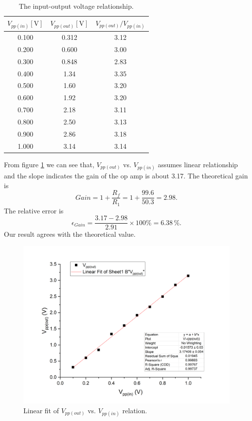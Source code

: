 \documentclass{article}
\begin{document}
\begin{table}[H]
\centering
\begin{tabular}{ccc}
\toprule
$V_{pp(in)}[\text{V}]$ & $V_{pp(out)}[\text{V}]$ & ${V_{pp(out)}}/{V_{pp(in)}}$\\
\midrule
0.100 & 0.312 & 3.12\\
0.200 & 0.600 & 3.00\\
0.300 & 0.848 & 2.83\\
0.400 & 1.34 & 3.35\\
0.500 & 1.60 & 3.20\\
0.600 & 1.92 & 3.20\\
0.700 & 2.18 & 3.11\\
0.800 & 2.50 & 3.13\\
0.900 & 2.86 & 3.18\\
1.000 & 3.14 & 3.14\\
\bottomrule
\end{tabular}
\caption{The input-output voltage relationship.}\label{TableV1}
\end{table}

From figure \ref{FigNonFit} we can see that, $V_{pp(out)}$ vs. $V_{pp(in)}$ assumes linear relationship and the slope indicates the gain of the op amp is about 3.17. The theoretical gain is 
$$Gain = 1 + \frac{R_f}{R_1} = 1 + \frac{99.6}{50.3} = 2.98.$$
The relative error is 
$$\epsilon_{Gain} = \frac{3.17-2.98}{2.91}\times 100\% =6.38\,\%.$$
Our result agrees with the theoretical value.

\begin{figure}[H]
\centering
\includegraphics[scale=0.4]{plot1.png}
\caption{Linear fit of $V_{pp(out)}$ vs. $V_{pp(in)}$ relation.}\label{FigNonFit}
\end{figure}
\end{document}

